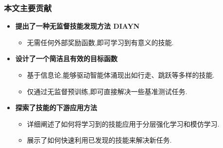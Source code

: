 \documentclass{beamer}
\begin{document}
\begin{frame}
    \frametitle{本文主要贡献 }

    \begin{itemize}
        \item \textbf{提出了一种无监督技能发现方法 DIAYN}
        \begin{itemize}
            \item 无需任何外部奖励函数,即可学习到有意义的技能.
        \end{itemize}
        \vspace{0.3cm}
        
        \item \textbf{设计了一个简洁且有效的目标函数}
        \begin{itemize}
            \item 基于信息论,能够驱动智能体涌现出如行走、跳跃等多样的技能.
            \item 仅通过无监督预训练,即可直接解决一些基准测试任务.
        \end{itemize}
        \vspace{0.3cm}
        
        \item \textbf{探索了技能的下游应用方法}
        \begin{itemize}
            \item 详细阐述了如何将学习到的技能应用于分层强化学习和模仿学习.
            \item 展示了如何快速利用已发现的技能来解决新任务.
        \end{itemize}
    \end{itemize}



\end{frame}
\end{document}
